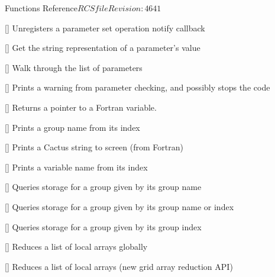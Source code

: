 \begin{cactuspart}{ Functions Reference}{$RCSfile$}{$Revision: 4641 $}
\begin{Lentry}
\item[\code{CCTK\_ParameterSetNotifyUnregister}]
  [\pageref{CCTK-ParameterSetNotifyUnregister}]
  Unregisters a parameter set operation notify callback

\item[\code{CCTK\_ParameterValString}]
  [\pageref{CCTK-ParameterValString}]
  Get the string representation of a parameter's value

\item[\code{CCTK\_ParameterWalk}]
  [\pageref{CCTK-ParameterWalk}]
  Walk through the list of parameters

\item[\code{CCTK\_PARAMWARN}] [\pageref{CCTK-PARAMWARN}]
  Prints a warning from parameter checking, and possibly stops the code

\item[\code{CCTK\_PointerTo}] [\pageref{CCTK-PointerTo}]
  Returns a pointer to a Fortran variable.

\item[\code{CCTK\_PrintGroup}] [\pageref{CCTK-PrintGroup}]
  Prints a group name from its index

\item[\code{CCTK\_PrintString}] [\pageref{CCTK-PrintString}]
  Prints a Cactus string to screen (from Fortran)

\item[\code{CCTK\_PrintVar}] [\pageref{CCTK-PrintVar}]
  Prints a variable name from its index

\item[\code{CCTK\_QueryGroupStorage}] [\pageref{CCTK-QueryGroupStorage}]
  Queries storage for a group given by its group name

\item[\code{CCTK\_QueryGroupStorageB}] [\pageref{CCTK-QueryGroupStorageB}]
  Queries storage for a group given by its group name or index

\item[\code{CCTK\_QueryGroupStorageI}] [\pageref{CCTK-QueryGroupStorageI}]
  Queries storage for a group given by its group index

\item[\code{CCTK\_ReduceArraysGlobally}] [\pageref{CCTK-ReduceArraysGlobally}]
  Reduces a list of local arrays globally

\item[\code{CCTK\_ReduceGridArrays}] [\pageref{CCTK-ReduceGridArrays}]
  Reduces a list of local arrays (new grid array reduction API)


\end{Lentry}
\end{cactuspart}
